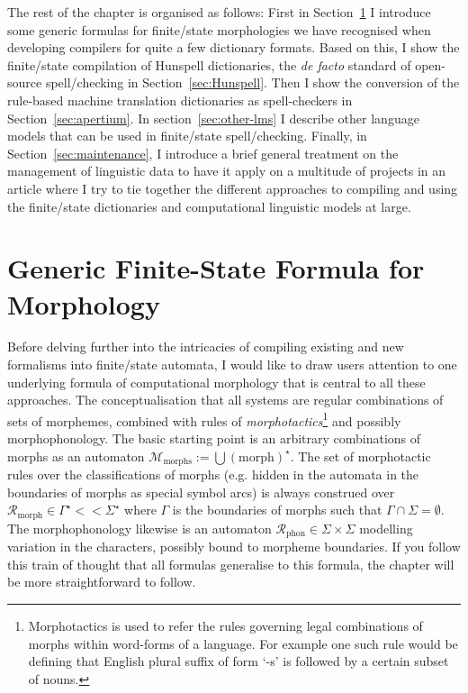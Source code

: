 \documentclass[officiallayout]{unihelcompling}
\begin{document}
The rest of the chapter is organised as follows: First in
Section~\ref{sec:generic} I introduce some generic formulas for finite\-/state
morphologies we have recognised when developing compilers for quite a few
dictionary formats. Based on this, I show the finite\-/state compilation of
Hunspell dictionaries, the \emph{de facto} standard of open-source spell\-/checking in
Section~\ref{sec:Hunspell}.  Then I show the conversion of the rule-based
machine translation dictionaries as spell-checkers in
Section~\ref{sec:apertium}. In section~\ref{sec:other-lms} I describe other
language models that can be used in finite\-/state spell\-/checking. Finally, in
Section~\ref{sec:maintenance}, I introduce a brief general treatment on the
management of linguistic data to have it apply on a multitude of projects in an
article where I try to tie together the different approaches to compiling and
using the finite\-/state dictionaries and computational linguistic models at
large.

\section{Generic Finite-State Formula for Morphology}
\label{sec:generic}

Before delving further into the intricacies of compiling existing and new
formalisms into finite\-/state automata, I would like to draw users attention
to one underlying formula of computational morphology that is central to all
these approaches. The conceptualisation that all systems are regular
combinations of sets of morphemes, combined with rules of
\emph{morphotactics}\footnote{Morphotactics is used to refer the rules
    governing legal combinations of morphs within word-forms of a language. For
example one such rule would be defining that English plural suffix of form `-s'
is followed by a certain subset of nouns.} and possibly morphophonology.  The
basic starting point is an arbitrary combinations of morphs as an automaton
$\mathcal{M}_{\mathrm{morphs}} := \bigcup ({\mathrm{morph}})^\star$. The set of
morphotactic rules over the classifications of morphs (e.g. hidden in the
automata in the boundaries of morphs as special symbol arcs) is always
construed over $\mathcal{R}_{\mathrm{morph}} \in \Gamma^\star << \Sigma^\star$
where $\Gamma$ is the boundaries of morphs such that $\Gamma \cap \Sigma =
\emptyset$. The morphophonology likewise is an automaton
$\mathcal{R}_{\mathrm{phon}} \in \Sigma \times \Sigma$ modelling variation in
the characters, possibly bound to morpheme boundaries. If you follow this train
of thought that all formulas generalise to this formula, the chapter will be
more straightforward to follow.
\end{document}
